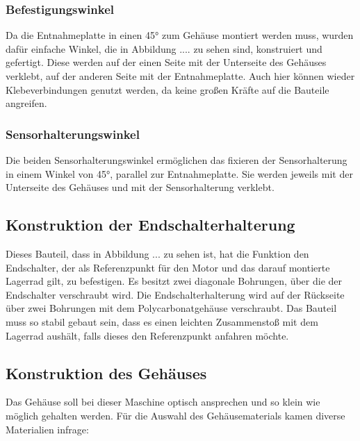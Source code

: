 \subsubsection{Befestigungswinkel}
Da die Entnahmeplatte  in einen 45° zum Gehäuse montiert werden muss, wurden dafür einfache Winkel, die in Abbildung .... zu sehen sind, konstruiert und gefertigt.
Diese werden auf der einen Seite mit der Unterseite des Gehäuses verklebt, auf der anderen Seite mit der Entnahmeplatte.
Auch hier können wieder Klebeverbindungen genutzt werden, da keine großen Kräfte auf die Bauteile angreifen.

\subsubsection{Sensorhalterungswinkel}
Die beiden Sensorhalterungswinkel ermöglichen das fixieren der Sensorhalterung in einem Winkel von 45°, parallel zur
Entnahmeplatte. Sie werden jeweils mit der Unterseite des Gehäuses und mit der Sensorhalterung verklebt.

\subsection{Konstruktion der Endschalterhalterung}
Dieses Bauteil, dass in Abbildung ... zu sehen ist, hat die Funktion den Endschalter, der als Referenzpunkt für den Motor und das darauf montierte
Lagerrad gilt, zu befestigen. Es besitzt zwei diagonale Bohrungen, über die der Endschalter verschraubt wird.
Die Endschalterhalterung wird auf der Rückseite über zwei Bohrungen mit dem Polycarbonatgehäuse verschraubt.
Das Bauteil muss so stabil gebaut sein, dass es einen leichten Zusammenstoß mit dem Lagerrad aushält, falls dieses
den Referenzpunkt anfahren möchte.

\subsection{Konstruktion des Gehäuses}
Das Gehäuse soll bei dieser Maschine optisch ansprechen und so klein wie möglich gehalten werden. Für die Auswahl
des Gehäusematerials kamen diverse Materialien infrage:

